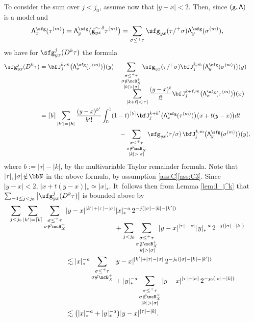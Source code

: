 To consider the sum over $j<j_0$, assume now that $|y-x|<2$. Then, since $\sf (g, \Lambda)$ is a model and
\begin{align*}
{\sf\Lambda}^{\sfg}_x(\tau^{(m)}) = {\sf\Lambda}^{\sfg}_y\bigl(\widehat{{\sf g}_{yx}}^{\delta}\tau^{(m)}\bigr) = \sum_{\sigma\le^+\tau}\sfg_{yx}(\tau/^+\sigma){\sf\Lambda}^{\sfg}_y(\sigma^{(m)}),
\end{align*}
we have for $\sfg_{yx}^j(D^k\tau)$ the formula
\begin{align*}
\sfg_{yx}^j(D^k\tau)
&=\bfJ_j^{k,m}\bigl({\sf\Lambda}^{\sfg}_x(\tau^{(m)})\bigr)(y) - \sum_{\substack{\sigma\le^+\tau\\ \sigma\notin\mcB_X^+\\|k|>|\sigma|}} \sfg_{yx}(\tau/^+\sigma)\bfJ_j^{k,m}\bigl({\sf\Lambda}^{\sfg}_y(\sigma^{(m)})\bigr)(y) \\[-10pt]
&\hspace*{4.5cm}- \sum_{|k+\ell|<|\tau|}\frac{(y-x)^\ell}{\ell!}\bfJ_j^{k+\ell, m}\bigl({\sf\Lambda}^{\sfg}_x(\tau^{(m)})\bigr)(x) \\
&= \lceil b\rceil\sum_{|k'|=\lceil b \rceil}\frac{(y-x)^{k'}}{{k'}!}\int_0^1(1-t)^{\lceil b\rceil}\bfJ_j^{k+{k'}}\bigl({\sf\Lambda}^{\sfg}_x(\tau^{(m)})\bigr)\bigl(x+t(y-x)\bigr)dt \\
&\hspace*{4.5cm}- \sum_{\substack{\sigma\le^+\tau\\\sigma\notin\mcB_X^+\\|k|>|\sigma|}}\sfg_{yx}(\tau/\sigma)\,\bfJ_j^{k,m}\bigl({\sf\Lambda}^\sfg_y(\sigma^{(m)})\bigr)(y),
\end{align*}
where $b\!:=\!|\tau|-|k|$, by the multivariable Taylor remainder formula. Note that $|\tau|,|\sigma|\!\notin\!\bbN$ in the above formula, by assumption \ref{ass:C}\eqref{ass:C3}. Since $|y-x|<2$, $|x+t(y-x)|_*\simeq|x|_*$. It~follows then from Lemma \ref{lem:I_j^k} that $\sum_{-1\leq j<j_0}\big|\sfg_{yx}^j(D^k\tau)\big|$ is bounded above by\vspace*{-3pt}
\begin{align*}
\sum_{j<j_0}\sum_{|{k'}|=\lceil b\rceil}\sum_{\substack{\sigma\leq^+\tau\\\sigma\notin\mcB_X^+}}& |y-x|^{|{k'}|+|\tau|-|\sigma|}|x|_*^{-a}\,2^{-j(|\sigma|-|k|-|{k'}|)} \\[-15pt]
&\hspace*{2.5cm}+ \sum_{j<j_0}\sum_{\substack{\sigma\le^+\tau\\\sigma\notin\mcB_X^+\\|k|>|\sigma|}} |y-x|^{|\tau|-|\sigma|}|y|_*^{-a}\,2^{-j(|\sigma|-|k|)} \\
&\lesssim |x|_*^{-a}\sum_{\substack{\sigma\leq^+\tau\\\sigma\notin\mcB_X^+}} |y-x|^{|{k'}|+|\tau|-|\sigma|}\,2^{-j_0(|\sigma|-|k|-|{k'}|)} \\[-12pt]
&\hspace*{2.5cm}+ |y|_*^{-a}\sum_{\substack{\sigma\le^+\tau\\\sigma\notin\mcB_X^+\\|k|>|\sigma|}}|y-x|^{|\tau|-|\sigma|}\,2^{-j_0(|\sigma|-|k|)} \\
&\lesssim\bigl(|x|_*^{-a}+|y|_*^{-a}\bigr)|y-x|^{|\tau|-|k|}.
\end{align*}
